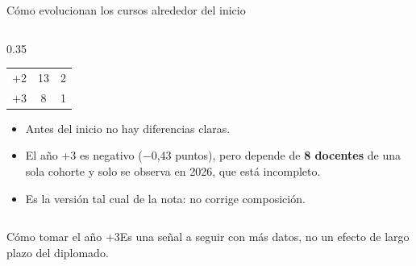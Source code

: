 \documentclass[10pt,aspectratio=169]{beamer}
\newcommand{\sintesis}[2]{%
  \begin{block}{#1}#2\end{block}}
\begin{document}
\begin{frame}{Cómo evolucionan los cursos alrededor del inicio}
\begin{columns}[c]
\begin{column}{0.35\textwidth}
\begin{table}
\begin{tabular}{lcc}
          +2 & 13 & 2 \\
          +3 & \alert{8} & \alert{1} \\
          \bottomrule
        \end{tabular}
      \end{table}
      \begin{itemize}
        \item Antes del inicio no hay diferencias claras.
        \item El año +3 es negativo ($-$0,43 puntos), pero depende de \textbf{8 docentes} de una sola cohorte y solo se observa en 2026, que está incompleto.
        \item Es la versión tal cual de la nota: no corrige composición.
      \end{itemize}
    \end{column}
  \end{columns}
  \sintesis{Cómo tomar el año +3}{Es una señal a seguir con más datos, no un efecto de largo plazo del diplomado.}
\end{frame}
\end{document}
